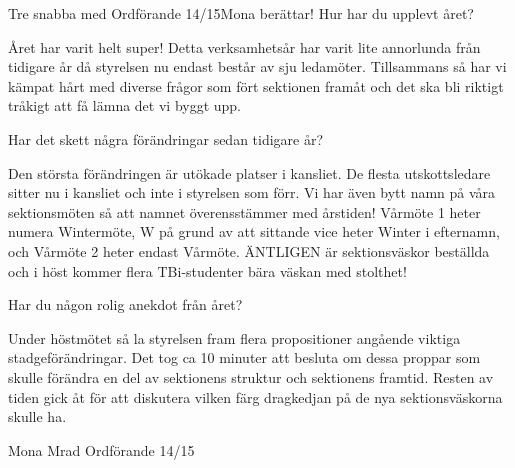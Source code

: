 \begin{news}{3}{Tre snabba med Ordförande 14/15}{Mona berättar!}
Hur har du upplevt året?

Året har varit helt super! Detta
verksamhetsår har varit lite annorlunda från tidigare år då styrelsen
nu endast består av sju ledamöter. Tillsammans så har vi kämpat hårt
med diverse frågor som fört sektionen framåt och det ska bli riktigt
tråkigt att få lämna det vi byggt upp.

Har det skett några förändringar sedan tidigare år?

Den största
förändringen är utökade platser i kansliet. De flesta utskottsledare
sitter nu i kansliet och inte i styrelsen som förr. Vi har även bytt
namn på våra sektionsmöten så att namnet överensstämmer med årstiden!
Vårmöte 1 heter numera Wintermöte, W på grund av att sittande vice
heter Winter i efternamn, och Vårmöte 2 heter endast Vårmöte. ÄNTLIGEN är sektionsväskor beställda och i höst kommer flera TBi-studenter bära
väskan med stolthet!

Har du någon rolig anekdot från året?

Under höstmötet så la styrelsen
fram flera propositioner angående viktiga stadgeförändringar. Det tog
ca 10 minuter att besluta om dessa proppar som skulle förändra en del
av sektionens struktur och sektionens framtid. Resten av tiden gick
åt för att diskutera vilken färg dragkedjan på de nya sektionsväskorna
skulle ha.

Mona Mrad
Ordförande 14/15

\end{news}
